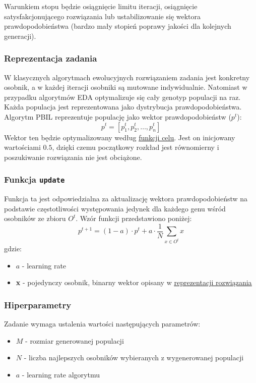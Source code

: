 \documentclass[11pt]{article}
\begin{document}
Warunkiem stopu będzie osiągnięcie limitu iteracji, osiągnięcie satysfakcjonującego rozwiązania lub ustabilizowanie się wektora prawdopodobieństwa (bardzo mały stopień poprawy jakości dla kolejnych generacji).
\subsubsection{Reprezentacja zadania}
\label{sec:org0be5ed0}
W klasycznych algorytmach ewolucyjnych rozwiązaniem zadania jest konkretny osobnik, a w każdej iteracji osobniki są mutowane indywidualnie. Natomiast w przypadku algorytmów EDA optymalizuje się cały genotyp populacji na raz. Każda populacja jest reprezentowana jako dystrybucja prawdopodobieństwa. Algorytm PBIL reprezentuje populację jako wektor prawdopodobieństw ($p^t$):
$$
p^t = [p^t_1,p^t_2,\dots,p^t_n]
$$
Wektor ten będzie optymalizowany według \uline{\hyperref[sec:orgfed3d26]{funkcji celu}}. Jest on inicjowany wartościami $0.5$, dzięki czemu początkowy rozkład jest równomierny i poszukiwanie rozwiązania nie jest obciążone.

\subsubsection{Funkcja \texttt{update}}
\label{sec:orga4c09fd}
Funkcja ta jest odpowiedzialna za aktualizację wektora prawdopodobieństw na podstawie częstotliwości występowania jedynek dla każdego genu wśród osobników ze zbioru $O^t$. Wzór funkcji przedstawiono poniżej:
$$
p^{t+1} = (1-a) \cdot p^t + a \cdot \frac{1}{N} \sum_{x \in O^t} x
$$
gdzie:
\begin{itemize}
\item $a$ - learning rate
\item \textbf{x} - pojedynczy osobnik, binarny wektor opisany w \hyperref[sec:org7c490b7]{\uline{reprezentacji rozwiązania}}
\end{itemize}

\subsubsection{Hiperparametry}
Zadanie wymaga ustalenia wartości następujących parametrów:
\begin{itemize}
\item $M$ - rozmiar generowanej populacji
\item $N$ - liczba najlepszych osobników wybieranych z wygenerowanej populacji
\item $a$ - learning rate algorytmu
\end{itemize}
\end{document}
